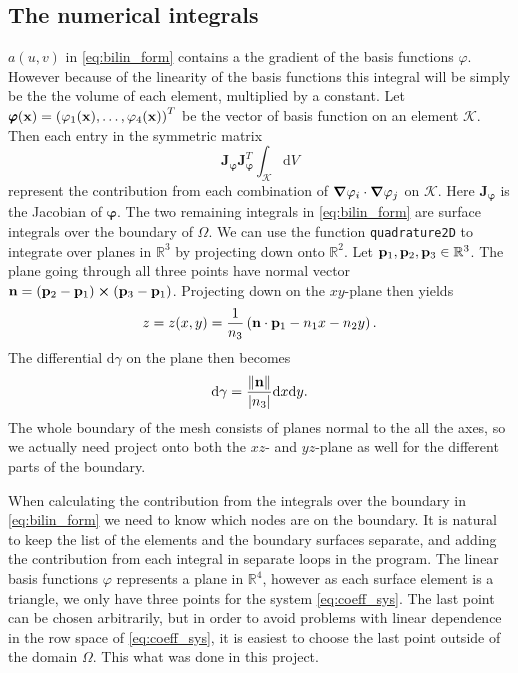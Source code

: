 \subsection{The numerical integrals}
$a(u,v)$ in \eqref{eq:bilin_form} contains a the gradient of the basis functions $\varphi$. However because of the linearity of the basis functions this integral will be simply be the the volume of each element, multiplied by a constant. Let $\pmb{\varphi}(\vb{x}) = \left(\varphi_1(\vb{x}),\dots,\varphi_4(\vb{x})\right)^T$ be the vector of basis function on an element $\mathcal{K}$. Then each entry in the symmetric matrix
\begin{equation}
    \pmb{J}_{\pmb{\varphi}}\pmb{J}_{\pmb{\varphi}}^T\int_\mathcal{K} \! \mathrm{d}V
\end{equation}
represent the contribution from each combination of $\grad{\varphi_i}\cdot\grad{\varphi_j}$ on $\mathcal{K}$. Here $\pmb{J}_{\pmb{\varphi}}$ is the Jacobian of $\pmb{\varphi}$. The two remaining integrals in \eqref{eq:bilin_form} are surface integrals over the boundary of $\Omega$. We can use the function \texttt{quadrature2D} to integrate over planes in $\mathbb{R}^3$ by projecting down onto $\mathbb{R}^2$. Let $\vb{p}_1,\vb{p}_2,\vb{p}_3 \in \mathbb{R}^3$. The plane going through all three points have normal vector $\vb{n} = (\vb{p}_2-\vb{p}_1)\cross (\vb{p}_3-\vb{p}_1)$. Projecting down on the $xy$-plane then yields
\begin{equation}
    z = z(x,y)=\frac{1}{n_3}\left(\vb{n}\cdot \vb{p}_1-n_1x-n_2y\right).
\end{equation}
The differential $\mathrm{d}\gamma$ on the plane then becomes
\begin{equation}
    \mathrm{d}\gamma = \frac{\norm{\vb{n}}}{\abs{n_3}}\mathrm{d}x\mathrm{d}y.
\end{equation}
The whole boundary of the mesh consists of planes normal to the all the axes, so we actually need project onto both the $xz$- and $yz$-plane as well for the different parts of the boundary.

When calculating the contribution from the integrals over the boundary in \eqref{eq:bilin_form} we need to know which nodes are on the boundary. It is natural to keep the list of the elements and the boundary surfaces separate, and adding the contribution from each integral in separate loops in the program. The linear basis functions $\varphi$ represents a plane in $\mathbb{R}^4$, however as each surface element is a triangle, we only have three points for the system \eqref{eq:coeff_sys}. The last point can be chosen arbitrarily,  but in order to avoid problems with linear dependence in the row space of \eqref{eq:coeff_sys}, it is easiest to choose the last point outside of the domain $\Omega$. This what was done in this project.

